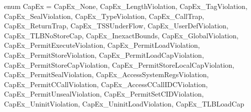 enum CapEx = {
  CapEx_None, 
  CapEx_LengthViolation,
  CapEx_TagViolation,
  CapEx_SealViolation,
  CapEx_TypeViolation,
  CapEx_CallTrap,
  CapEx_ReturnTrap,
  CapEx_TSSUnderFlow,
  CapEx_UserDefViolation,
  CapEx_TLBNoStoreCap,
  CapEx_InexactBounds,
  CapEx_GlobalViolation,
  CapEx_PermitExecuteViolation,
  CapEx_PermitLoadViolation,
  CapEx_PermitStoreViolation,
  CapEx_PermitLoadCapViolation,
  CapEx_PermitStoreCapViolation,
  CapEx_PermitStoreLocalCapViolation,
  CapEx_PermitSealViolation,
  CapEx_AccessSystemRegsViolation,
  CapEx_PermitCCallViolation,
  CapEx_AccessCCallIDCViolation,
  CapEx_PermitUnsealViolation,
  CapEx_PermitSetCIDViolation,
  CapEx_UninitViolation,
  CapEx_UninitLoadViolation,
  CapEx_TLBLoadCap
}
